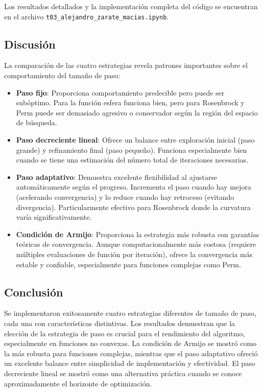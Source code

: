 \documentclass{article}
\begin{document}
Los resultados detallados y la implementación completa del código se encuentran en el archivo \texttt{t03\_alejandro\_zarate\_macias.ipynb}.

\subsection{Discusión}

La comparación de las cuatro estrategias revela patrones importantes sobre el comportamiento del tamaño de paso:

\begin{itemize}
    \item \textbf{Paso fijo}: Proporciona comportamiento predecible pero puede ser subóptimo. Para la función esfera funciona bien, pero para Rosenbrock y Perm puede ser demasiado agresivo o conservador según la región del espacio de búsqueda.
    
    \item \textbf{Paso decreciente lineal}: Ofrece un balance entre exploración inicial (paso grande) y refinamiento final (paso pequeño). Funciona especialmente bien cuando se tiene una estimación del número total de iteraciones necesarias.
    
    \item \textbf{Paso adaptativo}: Demuestra excelente flexibilidad al ajustarse automáticamente según el progreso. Incrementa el paso cuando hay mejora (acelerando convergencia) y lo reduce cuando hay retroceso (evitando divergencia). Particularmente efectivo para Rosenbrock donde la curvatura varía significativamente.
    
    \item \textbf{Condición de Armijo}: Proporciona la estrategia más robusta con garantías teóricas de convergencia. Aunque computacionalmente más costosa (requiere múltiples evaluaciones de función por iteración), ofrece la convergencia más estable y confiable, especialmente para funciones complejas como Perm.
\end{itemize}

\subsection{Conclusión}

Se implementaron exitosamente cuatro estrategias diferentes de tamaño de paso, cada una con características distintivas. Los resultados demuestran que la elección de la estrategia de paso es crucial para el rendimiento del algoritmo, especialmente en funciones no convexas. La condición de Armijo se mostró como la más robusta para funciones complejas, mientras que el paso adaptativo ofreció un excelente balance entre simplicidad de implementación y efectividad. El paso decreciente lineal se mostró como una alternativa práctica cuando se conoce aproximadamente el horizonte de optimización.
\end{document}
